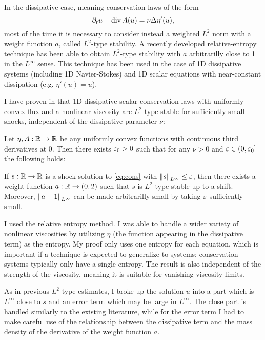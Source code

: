 In the dissipative case, meaning conservation laws of the form
\begin{equation} \label{eq:cons} \partial_t u + \operatorname{div} A(u) = \nu \Delta \eta'(u), \end{equation}
most of the time it is necessary to consider instead a weighted $L^2$ norm with a weight function $a$, called $L^2$-type stability.  A recently developed relative-entropy technique has been able to obtain $L^2$-type stability with $a$ arbitrarilly close to 1 in the $L^\infty$ sense.  This technique has been used in the case of 1D dissipative systems \cite{KaVa.navier} (including 1D Navier-Stokes) and 1D scalar equations with near-constant dissipation \cite{KaVa.burgers} (e.g. $\eta'(u)=u$).  

I have proven in \cite{St.shocks} that 1D dissipative scalar conservation laws with uniformly convex flux and a nonlinear viscosity are $L^2$-type stable for sufficiently small shocks, independent of the dissipative parameter $\nu$:
\begin{theorem}
Let $\eta, A: \mathbb{R} \to \mathbb{R}$ be any uniformly convex functions with continuous third derivatives at 0. Then there exists $\varepsilon_0 > 0$ such that for any $\nu > 0$ and $\varepsilon \in (0,\varepsilon_0]$ the following holds:

If $s:\mathbb{R} \to \mathbb{R}$ is a shock solution to \eqref{eq:cons} with $\left\lVert s\right\rVert_{L^\infty} \leq \varepsilon$, then there exists a weight function $a:\mathbb{R} \to (0,2)$ such that $s$ is $L^2$-type stable up to a shift.  Moreover, $\left\lVert a-1\right\rVert_{L^\infty}$ can be made arbitrarilly small by taking $\varepsilon$ sufficiently small.  
\end{theorem}
I used the relative entropy method.  I was able to handle a wider variety of nonlinear viscosities by utilizing $\eta$ (the function appearing in the dissipative term) as the entropy.  My proof only uses one entropy for each equation, which is important if a technique is expected to generalize to systems; conservation systems typically only have a single entropy.  The result is also independent of the strength of the viscosity, meaning it is suitable for vanishing viscosity limits.  

As in previous $L^2$-type estimates, I broke up the solution $u$ into a part which is $L^\infty$ close to $s$ and an error term which may be large in $L^\infty$.  The close part is handled similarly to the existing literature, while for the error term I had to make careful use of the relationship between the dissipative term and the mass density of the derivative of the weight function $a$.  

